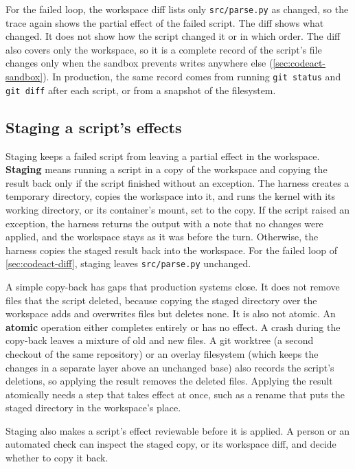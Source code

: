 For the failed loop, the workspace diff lists only \texttt{src/parse.py} as changed, so the trace
again shows the partial effect of the failed script. The diff shows
what changed. It does not show how the script changed it or in which order. The diff also covers
only the workspace, so it is a complete record of the script's file changes only when the sandbox
prevents writes anywhere else (\cref{sec:codeact-sandbox}). In production, the same record comes
from running \texttt{git status} and \texttt{git diff} after each script, or from a snapshot of the
filesystem.

\subsection{Staging a script's effects}
\label{sec:codeact-staging}

Staging keeps a failed script from leaving a partial effect in the workspace. \textbf{Staging}
means running a script in a copy of the workspace and copying the result back only if the script
finished without an exception. The harness creates a temporary directory, copies the workspace into
it, and runs the kernel with its working directory, or its container's mount, set to the copy. If
the script raised an exception, the harness returns the output with a note that no changes were
applied, and the workspace stays as it was before the turn. Otherwise, the harness copies the
staged result back into the workspace. For the failed loop of \cref{sec:codeact-diff}, staging
leaves \texttt{src/parse.py} unchanged.

A simple copy-back has gaps that production systems close. It does not remove files
that the script deleted, because copying the staged directory over the workspace adds and
overwrites files but deletes none. It is also not atomic. An \textbf{atomic} operation either
completes entirely or has no effect. A crash during the copy-back leaves a mixture of old and new
files. A git worktree (a second checkout of the same repository) or an overlay filesystem (which
keeps the changes in a separate layer above an unchanged base) also records the script's deletions,
so applying the result removes the deleted files. Applying the result atomically needs a step that
takes effect at once, such as a rename that puts the staged directory in the workspace's place.

Staging also makes a script's effect reviewable before it is applied. A person or an automated
check can inspect the staged copy, or its workspace diff, and decide whether to copy it back.

